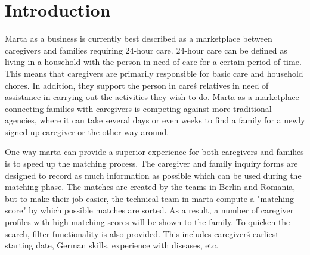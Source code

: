\newpage
\section{Introduction}

Marta as a business is currently best described as a marketplace between caregivers and families requiring 24-hour care. 24-hour care can be defined as living in a household with the person in need of care for a certain period of time. This means that caregivers are primarily responsible for basic care and household chores. In addition, they support the person in care\'s relatives in need of assistance in carrying out the activities they wish to do. Marta as a marketplace connecting families with caregivers is competing against more traditional agencies, where it can take several days or even weeks to find a family for a newly signed up caregiver or the other way around.

One way marta can provide a superior experience for both caregivers and families is to speed up the matching process. The caregiver and family inquiry forms are designed to record as much information as possible which can be used during the matching phase. The matches are created by the teams in Berlin and Romania, but to make their job easier, the technical team in marta compute a "matching score" by which possible matches are sorted. As a result, a number of caregiver profiles with high matching scores will be shown to the family. To quicken the search, filter functionality is also provided. This includes caregiver\'s earliest starting date, German skills, experience with diseases, etc.
